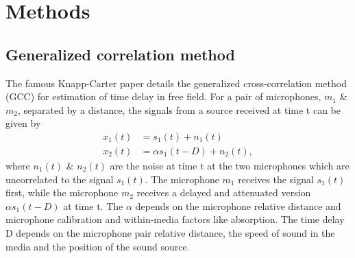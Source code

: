 \section{Methods}
\subsection{Generalized correlation method}
The famous Knapp-Carter paper details the generalized cross-correlation method (GCC) for estimation of time delay \cite{1162830} in free field. For a pair of microphones, $m_1$ \& $m_2$, separated by a distance, the signals from a source received at time t can be given by
\begin{equation}
    \begin{split}
        x_1(t) &= s_1(t) + n_1(t) \\
        x_2(t) &= \alpha s_1(t - D) + n_2(t) ,
    \end{split}
\end{equation}
where $n_1(t)$ \& $n_2(t)$ are the noise at time t at the two microphones which are uncorrelated to the signal $s_1(t)$. The microphone $m_1$ receives the signal $s_1(t)$ first, while the microphone $m_2$ receives a delayed and attenuated version $\alpha s_1(t - D)$ at time t. The $\alpha$ depends on the microphone relative distance and microphone calibration and within-media factors like absorption. The time delay D depends on the microphone pair relative distance, the speed of sound in the media and the position of the sound source. 

